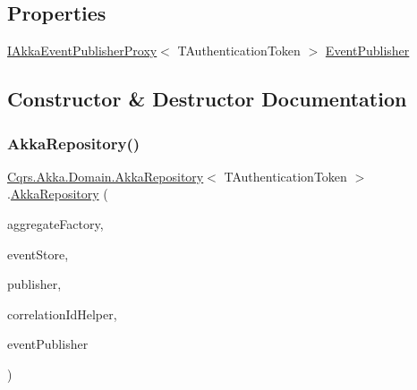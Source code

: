 \subsection*{Properties}
\begin{DoxyCompactItemize}
\item 
\hyperlink{interfaceCqrs_1_1Akka_1_1Events_1_1IAkkaEventPublisherProxy}{I\+Akka\+Event\+Publisher\+Proxy}$<$ T\+Authentication\+Token $>$ \hyperlink{classCqrs_1_1Akka_1_1Domain_1_1AkkaRepository_a52d17021123b6f56b213312351a83d55}{Event\+Publisher}
\end{DoxyCompactItemize}


\subsection{Constructor \& Destructor Documentation}
\mbox{\label{classCqrs_1_1Akka_1_1Domain_1_1AkkaRepository_a2279bbdecbc33f50b20159aaec0805bf}} 
\subsubsection{\texorpdfstring{Akka\+Repository()}{AkkaRepository()}}
{\footnotesize\ttfamily \hyperlink{classCqrs_1_1Akka_1_1Domain_1_1AkkaRepository}{Cqrs.\+Akka.\+Domain.\+Akka\+Repository}$<$ T\+Authentication\+Token $>$.\hyperlink{classCqrs_1_1Akka_1_1Domain_1_1AkkaRepository}{Akka\+Repository} (\begin{DoxyParamCaption}\item[{\hyperlink{interfaceCqrs_1_1Domain_1_1Factories_1_1IAggregateFactory}{I\+Aggregate\+Factory}}]{aggregate\+Factory,  }\item[{\hyperlink{interfaceCqrs_1_1Events_1_1IEventStore}{I\+Event\+Store}$<$ T\+Authentication\+Token $>$}]{event\+Store,  }\item[{\hyperlink{interfaceCqrs_1_1Events_1_1IEventPublisher}{I\+Event\+Publisher}$<$ T\+Authentication\+Token $>$}]{publisher,  }\item[{I\+Correlation\+Id\+Helper}]{correlation\+Id\+Helper,  }\item[{\hyperlink{interfaceCqrs_1_1Akka_1_1Events_1_1IAkkaEventPublisherProxy}{I\+Akka\+Event\+Publisher\+Proxy}$<$ T\+Authentication\+Token $>$}]{event\+Publisher }\end{DoxyParamCaption})}



